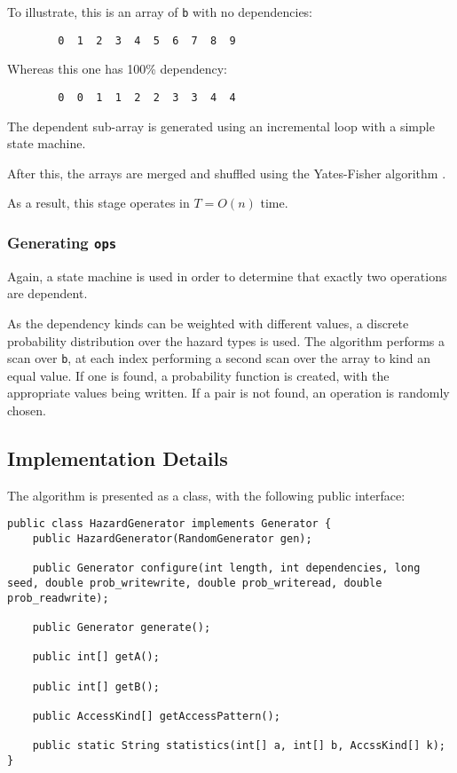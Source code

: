 		To illustrate, this is an array of \texttt{b} with no dependencies:
		
		\begin{verbatim}
		0  1  2  3  4  5  6  7  8  9
		\end{verbatim}
		
		Whereas this one has 100\% dependency:
		
		\begin{verbatim}
		0  0  1  1  2  2  3  3  4  4
		\end{verbatim}
		
		The dependent sub-array is generated using an incremental loop with a simple state machine.
		
		After this, the arrays are merged and shuffled using the Yates-Fisher algorithm \citep[p.~145]{TAOCPvol2}.
		
		As a result, this stage operates in $T=O(n)$ time.
		
		\subsubsection{Generating \texttt{ops}} \label{sec:methodology/params/algo/gen-ops}
		Again, a state machine is used in order to determine that exactly two operations are dependent.
		
		As the dependency kinds can be weighted with different values, a discrete probability distribution over the hazard types is used. The algorithm performs a scan over \texttt{b}, at each index performing a second scan over the array to kind an equal value. If one is found, a probability function is created, with the appropriate values being written. If a pair is not found, an operation is randomly chosen.
	
	\subsection{Implementation Details} \label{sec:methodology/params/implementation}
	The algorithm is presented as a class, with the following public interface:
	
	\begin{lstlisting}
public class HazardGenerator implements Generator {
	public HazardGenerator(RandomGenerator gen);
	
	public Generator configure(int length, int dependencies, long seed, double prob_writewrite, double prob_writeread, double prob_readwrite);
	
	public Generator generate();
	
	public int[] getA();
	
	public int[] getB();
	
	public AccessKind[] getAccessPattern();
	
	public static String statistics(int[] a, int[] b, AccssKind[] k);
}\end{lstlisting}

